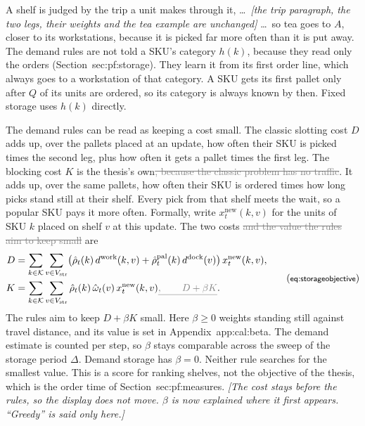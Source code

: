 \documentclass[11pt,a4paper]{article}
\newcommand{\new}[1]{\textcolor{newc}{#1}}
\newcommand{\old}[1]{\textcolor{gray}{\sout{#1}}}
\newcommand{\note}[1]{{\small\itshape [#1]}}
\newcommand{\lab}[1]{\textsf{\footnotesize #1}}
\renewcommand{\ref}[1]{\lab{#1}}
\begin{document}
A shelf is judged by the trip a unit makes through it, \dots\ \note{the
trip paragraph, the two legs, their weights and the tea example are
unchanged} \dots\ so tea goes to $A$, closer to its workstations, because it
is picked far more often than it is put away.
The demand rules are not told a SKU's category $h(k)$\new{, because they
read only the orders (Section~\ref{sec:pf:storage})}. They learn it from its
first order line, which always goes to a workstation of that category.
\new{A SKU gets its first pallet only after $Q$ of its units are ordered, so
its category is always known by then.} Fixed storage uses $h(k)$ directly.

The demand rules can be read as keeping a cost small. The classic slotting
cost $D$ adds up, over the pallets placed at an update, how often their SKU
is picked times the second leg, plus how often it gets a pallet times the
first leg. The blocking cost $K$ is the thesis's own\old{, because the
classic problem has no traffic}. It adds up, over the same pallets, how
often their SKU is ordered times how long picks stand still at their shelf.
Every pick from that shelf meets the wait, so a popular SKU pays it more
often. Formally, write $x^{\mathrm{new}}_t(k,v)$ for the units of SKU $k$
placed on shelf $v$ at this update. The two costs \old{and the value the
rules aim to keep small} are
\begin{equation*}
\begin{aligned}
D &= \sum_{k\in\mathcal{K}}\sum_{v\in V_{\mathrm{str}}}
  \bigl(\hat\rho_t(k)\,d^{\mathrm{work}}(k,v)+\hat\rho^{\mathrm{pal}}_t(k)\,d^{\mathrm{dock}}(v)\bigr)\,x^{\mathrm{new}}_t(k,v),
\\
K &= \sum_{k\in\mathcal{K}}\sum_{v\in V_{\mathrm{str}}}
  \hat\rho_t(k)\,\hat\omega_t(v)\,x^{\mathrm{new}}_t(k,v)\old{,
  \qquad D+\beta K} .
\end{aligned}
\tag{\lab{eq:storageobjective}}
\end{equation*}
\new{The rules aim to keep $D+\beta K$ small. Here $\beta \ge 0$ weights
standing still against travel distance, and its value is set in
Appendix~\ref{app:cal:beta}. The demand estimate is counted per step, so
$\beta$ stays comparable across the sweep of the storage period $\Delta$.}
Demand storage has $\beta=0$. Neither rule searches for the smallest value.
This is a score for ranking shelves, not the objective of the thesis, which
is the order time of Section~\ref{sec:pf:measures}.
\note{The cost stays before the rules, so the display does not move. $\beta$
is now explained where it first appears. ``Greedy'' is said only here.}
\end{document}
